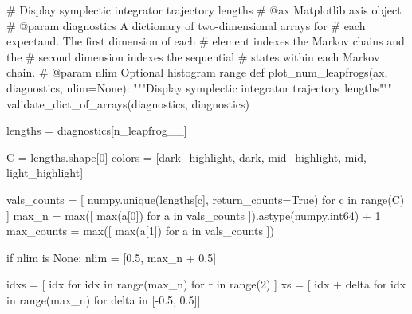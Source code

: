 \documentclass[
  letterpaper,
  DIV=11,
  numbers=noendperiod]{scrartcl}
\newenvironment{Shaded}{\begin{snugshade}}{\end{snugshade}}
\newcommand{\BuiltInTok}[1]{\textcolor[rgb]{0.00,0.23,0.31}{#1}}
\newcommand{\CommentTok}[1]{\textcolor[rgb]{0.37,0.37,0.37}{#1}}
\newcommand{\ControlFlowTok}[1]{\textcolor[rgb]{0.00,0.23,0.31}{#1}}
\newcommand{\DecValTok}[1]{\textcolor[rgb]{0.68,0.00,0.00}{#1}}
\newcommand{\FloatTok}[1]{\textcolor[rgb]{0.68,0.00,0.00}{#1}}
\newcommand{\KeywordTok}[1]{\textcolor[rgb]{0.00,0.23,0.31}{#1}}
\newcommand{\NormalTok}[1]{\textcolor[rgb]{0.00,0.23,0.31}{#1}}
\newcommand{\OperatorTok}[1]{\textcolor[rgb]{0.37,0.37,0.37}{#1}}
\newcommand{\StringTok}[1]{\textcolor[rgb]{0.13,0.47,0.30}{#1}}
\newcommand{\VariableTok}[1]{\textcolor[rgb]{0.07,0.07,0.07}{#1}}
\begin{document}
\begin{Shaded}
\begin{Highlighting}[]
\CommentTok{\# Display symplectic integrator trajectory lengths}
\CommentTok{\# @ax Matplotlib axis object}
\CommentTok{\# @param diagnostics A dictionary of two{-}dimensional arrays for}
\CommentTok{\#                    each expectand.  The first dimension of each}
\CommentTok{\#                    element indexes the Markov chains and the}
\CommentTok{\#                    second dimension indexes the sequential}
\CommentTok{\#                    states within each Markov chain.}
\CommentTok{\# @param nlim Optional histogram range}
\KeywordTok{def}\NormalTok{ plot\_num\_leapfrogs(ax, diagnostics, nlim}\OperatorTok{=}\VariableTok{None}\NormalTok{):}
  \CommentTok{"""Display symplectic integrator trajectory lengths"""}
\NormalTok{  validate\_dict\_of\_arrays(diagnostics, }\StringTok{\textquotesingle{}diagnostics\textquotesingle{}}\NormalTok{)}

\NormalTok{  lengths }\OperatorTok{=}\NormalTok{ diagnostics[}\StringTok{\textquotesingle{}n\_leapfrog\_\_\textquotesingle{}}\NormalTok{]}
  
\NormalTok{  C }\OperatorTok{=}\NormalTok{ lengths.shape[}\DecValTok{0}\NormalTok{]}
\NormalTok{  colors }\OperatorTok{=}\NormalTok{ [dark\_highlight, dark, mid\_highlight, mid, light\_highlight]}
  
\NormalTok{  vals\_counts }\OperatorTok{=}\NormalTok{ [ numpy.unique(lengths[c], return\_counts}\OperatorTok{=}\VariableTok{True}\NormalTok{) }
                  \ControlFlowTok{for}\NormalTok{ c }\KeywordTok{in} \BuiltInTok{range}\NormalTok{(C) ] }
\NormalTok{  max\_n }\OperatorTok{=} \BuiltInTok{max}\NormalTok{([ }\BuiltInTok{max}\NormalTok{(a[}\DecValTok{0}\NormalTok{]) }\ControlFlowTok{for}\NormalTok{ a }\KeywordTok{in}\NormalTok{ vals\_counts ]).astype(numpy.int64) }\OperatorTok{+} \DecValTok{1}
\NormalTok{  max\_counts }\OperatorTok{=} \BuiltInTok{max}\NormalTok{([ }\BuiltInTok{max}\NormalTok{(a[}\DecValTok{1}\NormalTok{]) }\ControlFlowTok{for}\NormalTok{ a }\KeywordTok{in}\NormalTok{ vals\_counts ])}
  
  \ControlFlowTok{if}\NormalTok{ nlim }\KeywordTok{is} \VariableTok{None}\NormalTok{:}
\NormalTok{    nlim }\OperatorTok{=}\NormalTok{ [}\FloatTok{0.5}\NormalTok{, max\_n }\OperatorTok{+} \FloatTok{0.5}\NormalTok{]}
  
\NormalTok{  idxs }\OperatorTok{=}\NormalTok{ [ idx }\ControlFlowTok{for}\NormalTok{ idx }\KeywordTok{in} \BuiltInTok{range}\NormalTok{(max\_n) }\ControlFlowTok{for}\NormalTok{ r }\KeywordTok{in} \BuiltInTok{range}\NormalTok{(}\DecValTok{2}\NormalTok{) ]}
\NormalTok{  xs }\OperatorTok{=}\NormalTok{ [ idx }\OperatorTok{+}\NormalTok{ delta }\ControlFlowTok{for}\NormalTok{ idx }\KeywordTok{in} \BuiltInTok{range}\NormalTok{(max\_n) }\ControlFlowTok{for}\NormalTok{ delta }\KeywordTok{in}\NormalTok{ [}\OperatorTok{{-}}\FloatTok{0.5}\NormalTok{, }\FloatTok{0.5}\NormalTok{]]}
  

\end{Highlighting}
\end{Shaded}
\end{document}
